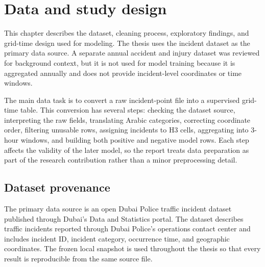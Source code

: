 \chapter{Data and study design}

This chapter describes the dataset, cleaning process, exploratory findings, and grid-time design used for modeling. The thesis uses the incident dataset as the primary data source. A separate annual accident and injury dataset was reviewed for background context, but it is not used for model training because it is aggregated annually and does not provide incident-level coordinates or time windows.

The main data task is to convert a raw incident-point file into a supervised grid-time table. This conversion has several steps: checking the dataset source, interpreting the raw fields, translating Arabic categories, correcting coordinate order, filtering unusable rows, assigning incidents to H3 cells, aggregating into 3-hour windows, and building both positive and negative model rows. Each step affects the validity of the later model, so the report treats data preparation as part of the research contribution rather than a minor preprocessing detail.

\section{Dataset provenance}

The primary data source is an open Dubai Police traffic incident dataset published through Dubai's Data and Statistics portal. The dataset describes traffic incidents reported through Dubai Police's operations contact center and includes incident ID, incident category, occurrence time, and geographic coordinates. The frozen local snapshot is used throughout the thesis so that every result is reproducible from the same source file.


